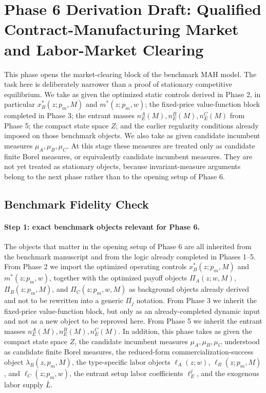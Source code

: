 \section{Phase 6 Derivation Draft: Qualified Contract-Manufacturing Market and Labor-Market Clearing}

This phase opens the market-clearing block of the benchmark MAH model. The task here is deliberately narrower than a proof of stationary competitive equilibrium. We take as given the optimized static controls derived in Phase 2, in particular $x_B^*(z;p_m,M)$ and $m^*(z;p_m,w)$; the fixed-price value-function block completed in Phase 3; the entrant masses $n_E^A(M),n_E^B(M),n_E^C(M)$ from Phase 5; the compact state space $Z$; and the earlier regularity conditions already imposed on those benchmark objects. We also take as given candidate incumbent measures $\mu_A,\mu_B,\mu_C$. At this stage these measures are treated only as candidate finite Borel measures, or equivalently candidate incumbent measures. They are not yet treated as stationary objects, because invariant-measure arguments belong to the next phase rather than to the opening setup of Phase 6.

\subsection{Benchmark Fidelity Check}

\paragraph{Step 1: exact benchmark objects relevant for Phase 6.}
The objects that matter in the opening setup of Phase 6 are all inherited from the benchmark manuscript and from the logic already completed in Phases 1--5. From Phase 2 we import the optimized operating controls $x_B^*(z;p_m,M)$ and $m^*(z;p_m,w)$, together with the optimized payoff objects $\Pi_A(z;w,M)$, $\Pi_B(z;p_m,M)$, and $\Pi_C(z;p_m,w,M)$ as background objects already derived and not to be rewritten into a generic $\Pi_j$ notation. From Phase 3 we inherit the fixed-price value-function block, but only as an already-completed dynamic input and not as a new object to be reproved here. From Phase 5 we inherit the entrant masses $n_E^A(M),n_E^B(M),n_E^C(M)$. In addition, this phase takes as given the compact state space $Z$, the candidate incumbent measures $\mu_A,\mu_B,\mu_C$ understood as candidate finite Borel measures, the reduced-form commercialization-success object $\lambda_B(z,p_m,M)$, the type-specific labor objects $\ell_A(z;w)$, $\ell_B(z;p_m,M)$, and $\ell_C(z;p_m,w)$, the entrant setup labor coefficients $\ell_E^j$, and the exogenous labor supply $\bar L$.

